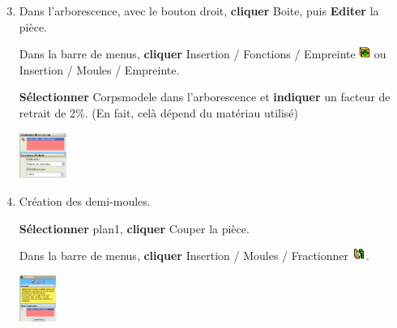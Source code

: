 \begin{enumerate}
 \setcounter{enumi}{2}
 \item Dans l'arborescence, avec le bouton droit, \textbf{cliquer} Boite, puis \textbf{Editer} la pièce. 

Dans la barre de menus, \textbf{cliquer} Insertion / Fonctions / Empreinte \includegraphics[height=0.4cm]{img/SW-039.png} ou Insertion / Moules / Empreinte. 

\begin{minipage}{0.6\linewidth}
 \textbf{Sélectionner} Corpsmodele dans l'arborescence et \textbf{indiquer} un facteur de retrait de 2\%. 
(En fait, celà dépend du matériau utilisé) 
\end{minipage}
\hfill
\begin{minipage}{0.39\linewidth}
 \includegraphics[height=1.5cm]{img/SW-040.png}  
\end{minipage}

 \item Création des demi-moules. 

\begin{minipage}{0.6\linewidth}
 \textbf{Sélectionner} plan1,  \textbf{cliquer} Couper la pièce. 
 
 Dans la barre de menus, \textbf{cliquer} Insertion / Moules / Fractionner \includegraphics[height=0.4cm]{img/SW-041.png}.
\end{minipage}
\hfill
\begin{minipage}{0.39\linewidth}
 \includegraphics[height=1.5cm]{img/SW-042.png}
\end{minipage}
\end{enumerate}


